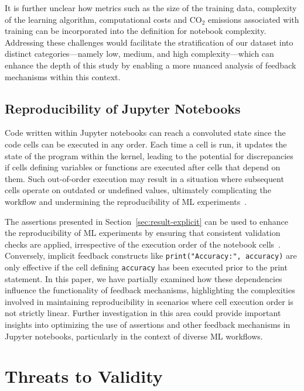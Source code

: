 \documentclass[smallextended]{svjour3}       %
\begin{document}
It is further unclear how metrics such as the size of the training data, complexity of the learning algorithm, computational costs and CO\(_2\) emissions associated with training can be incorporated into the definition for notebook complexity. Addressing these challenges would facilitate the stratification of our dataset into distinct categories---namely low, medium, and high complexity---which can enhance the depth of this study by enabling a more nuanced analysis of feedback mechanisms within this context.

\subsection{Reproducibility of Jupyter Notebooks}

Code written within Jupyter notebooks can reach a convoluted state since the code cells can be executed in any order. Each time a cell is run, it updates the state of the program within the kernel, leading to the potential for discrepancies if cells defining variables or functions are executed after cells that depend on them. Such out-of-order execution may result in a situation where subsequent cells operate on outdated or undefined values, ultimately complicating the workflow and undermining the reproducibility of ML experiments~\citep{pimentel2019large-scale,wang2020assessing}.

The assertions presented in Section~\ref{sec:result-explicit} can be used to enhance the reproducibility of ML experiments by ensuring that consistent validation checks are applied, irrespective of the execution order of the notebook cells~\citep{wang2020assessing}. Conversely, implicit feedback constructs like \lstinline{print("Accuracy:", accuracy)} are only effective if the cell defining \lstinline{accuracy} has been executed prior to the print statement. In this paper, we have partially examined how these dependencies influence the functionality of feedback mechanisms, highlighting the complexities involved in maintaining reproducibility in scenarios where cell execution order is not strictly linear. Further investigation in this area could provide important insights into optimizing the use of assertions and other feedback mechanisms in Jupyter notebooks, particularly in the context of diverse ML workflows.

\section{Threats to Validity}\label{sec:threats}
\end{document}
